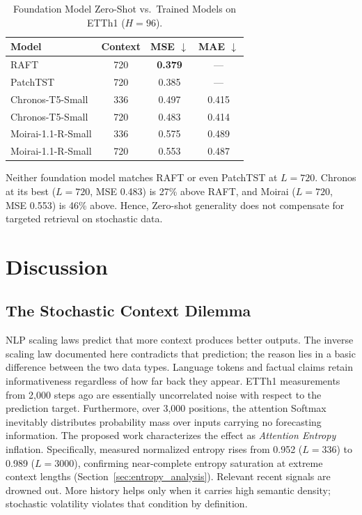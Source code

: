 \documentclass{article} %
\begin{document}
\begin{table}[h]
\centering
\caption{Foundation Model Zero-Shot vs.\ Trained Models on ETTh1 ($H=96$).}
\label{tab:foundation}
\small
\begin{tabular}{lccc}
\toprule
\textbf{Model} & \textbf{Context} & \textbf{MSE $\downarrow$} & \textbf{MAE $\downarrow$} \\
\midrule
RAFT & 720 & \textbf{0.379} & --- \\
PatchTST & 720 & 0.385 & --- \\
\midrule
Chronos-T5-Small & 336 & 0.497 & 0.415 \\
Chronos-T5-Small & 720 & 0.483 & 0.414 \\
Moirai-1.1-R-Small & 336 & 0.575 & 0.489 \\
Moirai-1.1-R-Small & 720 & 0.553 & 0.487 \\
\bottomrule
\end{tabular}
\end{table}

Neither foundation model matches RAFT or even PatchTST at $L=720$. Chronos at its best ($L=720$, MSE 0.483) is 27\% above RAFT, and Moirai ($L=720$, MSE 0.553) is 46\% above. Hence, Zero-shot generality does not compensate for targeted retrieval on stochastic data.

\section{Discussion}

\subsection{The Stochastic Context Dilemma}
NLP scaling laws predict that more context produces better outputs. The inverse scaling law documented here contradicts that prediction; the reason lies in a basic difference between the two data types. Language tokens and factual claims retain informativeness regardless of how far back they appear. ETTh1 measurements from 2,000 steps ago are essentially uncorrelated noise with respect to the prediction target. Furthermore, over 3,000 positions, the attention Softmax inevitably distributes probability mass over inputs carrying no forecasting information. The proposed work characterizes the effect as \textit{Attention Entropy} inflation. Specifically, measured normalized entropy rises from 0.952 ($L=336$) to 0.989 ($L=3000$), confirming near-complete entropy saturation at extreme context lengths (Section~\ref{sec:entropy_analysis}). Relevant recent signals are drowned out. More history helps only when it carries high semantic density; stochastic volatility violates that condition by definition.
\end{document}
